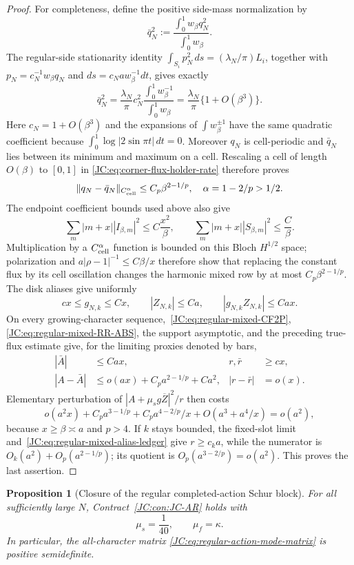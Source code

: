 \documentclass[11pt]{amsart}
\numberwithin{equation}{section}
\newtheorem{proposition}[theorem]{Proposition}
\theoremstyle{definition}
\theoremstyle{remark}
\begin{document}
\begin{proof}
For completeness, define the positive side-mass normalization by
\[
 \bar q_N^2:=
 \frac{\int_0^1w_\beta q_N^2}{\int_0^1w_\beta}.
\]
The regular-side stationarity identity
$\int_{S_i}p_N^2\,ds=(\lambda_N/\pi)L_i$, together with
$p_N=c_N^{-1}w_\beta q_N$ and
$ds=c_Na w_\beta^{-1}dt$, gives exactly
\[
 \bar q_N^2=\frac{\lambda_N}{\pi}c_N^2
 \frac{\int_0^1w_\beta^{-1}}{\int_0^1w_\beta}
 =\frac{\lambda_N}{\pi}\{1+O(\beta^3)\}.
\]
Here $c_N=1+O(\beta^3)$ and the expansions of
$\int w_\beta^{\pm1}$ have the same quadratic coefficient because
$\int_0^1\log|2\sin\pi t|\,dt=0$.  Moreover $q_N$ is cell-periodic and
$\bar q_N$ lies between its minimum and maximum on a cell.  Rescaling a
cell of length $O(\beta)$ to $[0,1]$ in
\eqref{JC:eq:corner-flux-holder-rate} therefore proves
\[
 \|q_N-\bar q_N\|_{C^\alpha_{\rm cell}}
 \le C_p\beta^{2-1/p},\quad \alpha=1-2/p>1/2.
\]
The endpoint coefficient bounds used above also give
\[
 \sum_m|m+x||I_{\beta,m}|^2\le C\frac{x^2}{\beta},\qquad
 \sum_m|m+x||S_{\beta,m}|^2\le\frac C\beta.
\]
Multiplication by a $C^\alpha_{\rm cell}$ function is bounded on this
Bloch $H^{1/2}$ space; polarization and
$a|\rho-1|^{-1}\le C\beta/x$ therefore show that replacing the constant
flux by its cell oscillation changes the harmonic mixed row by at most
$C_p\beta^{2-1/p}$.  The disk aliases give
uniformly
\begin{equation}\label{JC:eq:regular-mixed-alias-ledger}
 cx\le g_{N,k}\le Cx,\qquad |Z_{N,k}|\le Ca,\qquad
 |g_{N,k}Z_{N,k}|\le Cax.
\end{equation}
On every growing-character sequence,~\eqref{JC:eq:regular-mixed-CF2P},
\eqref{JC:eq:regular-mixed-RR-ABS}, the support asymptotic, and the preceding
true-flux estimate give, for the limiting proxies denoted by bars,
\begin{align*}
 |\bar A|&\le Cax,& r,\bar r&\ge cx,\\
 |A-\bar A|&\le o(ax)+C_pa^{2-1/p}+Ca^2,&
 |r-\bar r|&=o(x).
\end{align*}
Elementary perturbation of $|A+\mu_sg\overline Z|^2/r$ then costs
\[
 o(a^2x)+C_pa^{3-1/p}+C_pa^{4-2/p}/x+O(a^3+a^4/x)=o(a^2),
\]
because $x\ge\beta\asymp a$ and $p>4$.  If $k$ stays bounded, the
fixed-slot limit and~\eqref{JC:eq:regular-mixed-alias-ledger} give
$r\ge c_ka$, while the numerator is
$O_k(a^2)+O_p(a^{2-1/p})$; its quotient is
$O_p(a^{3-2/p})=o(a^2)$.  This proves the last assertion.
\end{proof}

\begin{proposition}[Closure of the regular completed-action Schur block]
\label{JC:prop:regular-action-Schur-closed}
For all sufficiently large $N$, Contract~\ref{JC:con:JC-AR} holds with
\begin{equation}\label{JC:eq:regular-action-closed-constants}
 \boxed{\mu_s=\frac1{40},\qquad \mu_f=\kappa.}
\end{equation}
In particular, the all-character matrix
\eqref{JC:eq:regular-action-mode-matrix} is positive semidefinite.
\end{proposition}
\end{document}
